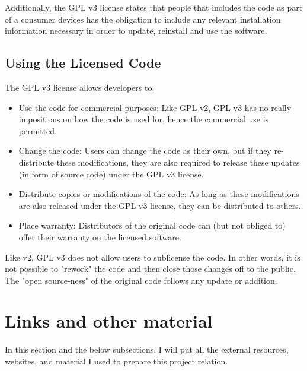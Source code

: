 \documentclass{article}
\begin{document}
Additionally, the GPL v3 license states that people that includes the code as part of a consumer devices has the obligation to include any relevant installation information necessary in order to update, reinstall and use the software.

\subsection{Using the Licensed Code}
The GPL v3 license allows developers to:

\begin{itemize}
\item Use the code for commercial purposes: Like GPL v2, GPL v3 has no really impositions on how the code is used for, hence the commercial use is permitted.
\item Change the code: Users can change the code as their own, but if they re-distribute these modifications, they are also required to release these updates (in form of source code) under the GPL v3 license.
\item Distribute copies or modifications of the code: As long as these modifications are also released under the GPL v3 license, they can be distributed to others.
\item Place warranty: Distributors of the original code can (but not obliged to) offer their warranty on the licensed software.
\end{itemize}

Like v2, GPL v3 does not allow users to sublicense the code. In other words, it is not possible to "rework" the code and then close those changes off to the public. The "open source-ness" of the original code follows any update or addition.

\newpage
\section{Links and other material}
In this section and the below subsections, I will put all the external resources, websites, and material I used to prepare this project relation.
\end{document}
